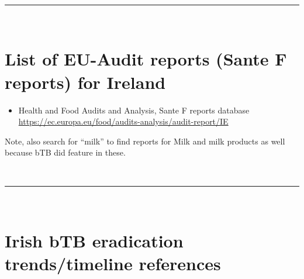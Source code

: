 \documentclass[
  letterpaper,
  DIV=11,
  numbers=noendperiod]{scrreprt}
\providecommand{\tightlist}{%
  \setlength{\itemsep}{0pt}\setlength{\parskip}{0pt}}
\begin{document}
\(~\) \(~\)

\begin{center}\rule{0.5\linewidth}{0.5pt}\end{center}

\(~\) \(~\)

\section{List of EU-Audit reports (Sante F reports) for
Ireland}\label{list-of-eu-audit-reports-sante-f-reports-for-ireland}

\begin{itemize}
\tightlist
\item
  Health and Food Audits and Analysis, Sante F reports database
  \url{https://ec.europa.eu/food/audits-analysis/audit-report/IE}
\end{itemize}

Note, also search for ``milk'' to find reports for Milk and milk
products as well because bTB did feature in these.

\(~\) \(~\)

\begin{center}\rule{0.5\linewidth}{0.5pt}\end{center}

\(~\) \(~\)

\section{Irish bTB eradication trends/timeline
references}\label{irish-btb-eradication-trendstimeline-references}
\end{document}
